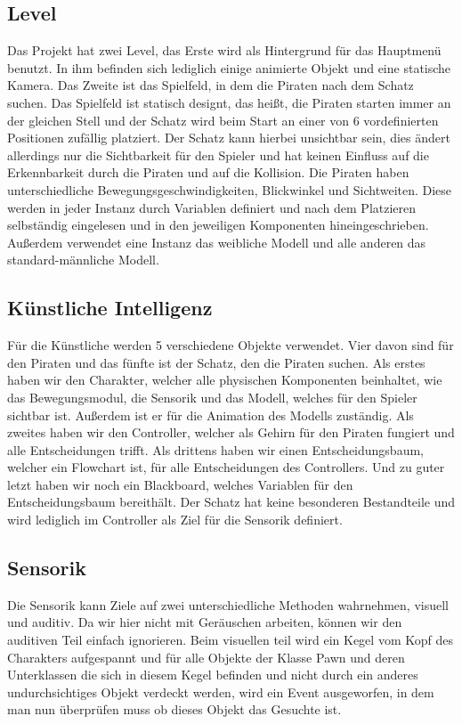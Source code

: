\documentclass[
	12pt, %
	a4paper,
	listof=totoc, %
	bibliography=totoc, %
	numbers=noenddot, %
	ngerman, %
	headsepline, %
	oneside %
	]{scrbook} %
\begin{document}
\subsection{Level}
Das Projekt hat zwei Level, das Erste wird als Hintergrund für das Hauptmenü benutzt. In ihm befinden sich lediglich einige animierte Objekt und eine statische Kamera. Das Zweite ist das Spielfeld, in dem die Piraten nach dem Schatz suchen. Das Spielfeld ist statisch designt, das heißt, die Piraten starten immer an der gleichen Stell und der Schatz wird beim Start an einer von 6 vordefinierten Positionen zufällig platziert. Der Schatz kann hierbei unsichtbar sein, dies ändert allerdings nur die Sichtbarkeit für den Spieler und hat keinen Einfluss auf die Erkennbarkeit durch die Piraten und auf die Kollision. Die Piraten haben unterschiedliche Bewegungsgeschwindigkeiten, Blickwinkel und Sichtweiten. Diese werden in jeder Instanz durch Variablen definiert und nach dem Platzieren selbständig eingelesen und in den jeweiligen Komponenten hineingeschrieben. Außerdem verwendet eine Instanz das weibliche Modell und alle anderen das standard-männliche Modell.

\subsection{Künstliche Intelligenz}
Für die Künstliche werden 5  verschiedene Objekte verwendet. Vier davon sind für den Piraten und das fünfte ist der Schatz, den die Piraten suchen. Als erstes haben wir den Charakter, welcher alle physischen Komponenten beinhaltet, wie das Bewegungsmodul, die Sensorik und das Modell, welches für den Spieler sichtbar ist. Außerdem ist er für die Animation des Modells zuständig. Als zweites haben wir den Controller, welcher als Gehirn für den Piraten fungiert und alle Entscheidungen trifft. Als drittens haben wir einen Entscheidungsbaum, welcher ein Flowchart ist, für alle Entscheidungen des Controllers.  Und zu guter letzt haben wir noch ein 
Blackboard, welches Variablen für den Entscheidungsbaum bereithält. Der Schatz hat keine besonderen Bestandteile und wird lediglich im Controller als Ziel für die Sensorik definiert.

\subsection{Sensorik}
Die Sensorik kann Ziele auf zwei unterschiedliche Methoden wahrnehmen, visuell und auditiv. Da wir hier nicht mit Geräuschen arbeiten, können wir den auditiven Teil einfach ignorieren. Beim visuellen teil wird ein Kegel vom Kopf des Charakters aufgespannt und für alle Objekte der Klasse Pawn und deren Unterklassen die sich in diesem Kegel befinden und nicht durch ein anderes undurchsichtiges Objekt verdeckt werden, wird ein Event ausgeworfen, in dem man nun überprüfen muss ob dieses Objekt das Gesuchte ist.
\end{document}
